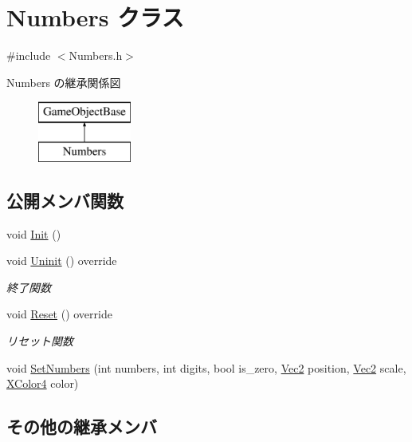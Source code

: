 \hypertarget{class_numbers}{}\section{Numbers クラス}
\label{class_numbers}


{\ttfamily \#include $<$Numbers.\+h$>$}

Numbers の継承関係図\begin{figure}[H]
\begin{center}
\leavevmode
\includegraphics[height=2.000000cm]{class_numbers}
\end{center}
\end{figure}
\subsection*{公開メンバ関数}
\begin{DoxyCompactItemize}
\item 
void \mbox{\hyperlink{class_numbers_a42158aa8dbb71308161c642aed8752e8}{Init}} ()
\item 
void \mbox{\hyperlink{class_numbers_aeaad3cc1b8ae7defe79813b983b04101}{Uninit}} () override
\begin{DoxyCompactList}\small\item\em 終了関数 \end{DoxyCompactList}\item 
void \mbox{\hyperlink{class_numbers_a1ab67e439ba1695c8fd545dfc1650990}{Reset}} () override
\begin{DoxyCompactList}\small\item\em リセット関数 \end{DoxyCompactList}\item 
void \mbox{\hyperlink{class_numbers_aeb51ecf4e148f4ca67ac7788e061f94d}{Set\+Numbers}} (int numbers, int digits, bool is\+\_\+zero, \mbox{\hyperlink{_vector3_d_8h_a5ef6e95dfc5f9d3820b71772d99bbc25}{Vec2}} position, \mbox{\hyperlink{_vector3_d_8h_a5ef6e95dfc5f9d3820b71772d99bbc25}{Vec2}} scale, \mbox{\hyperlink{_vector3_d_8h_a680c30c4a07d86fe763c7e01169cd6cc}{X\+Color4}} color)
\end{DoxyCompactItemize}
\subsection*{その他の継承メンバ}


